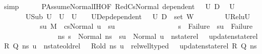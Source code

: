 \begin{isabellebody}
\ simp\isanewline
\ \ \ \ \isamarkupfalse%
\ PAssumeNormal{\isachardot}{\kern0pt}IH{\isacharbrackleft}{\kern0pt}OF\ RedCs{}Normal\ {\isacartoucheopen}dependent\ {\isasymLambda}{\isacharprime}{\kern0pt}\ {\isasymOmega}\ U{}\ D{}{\isacartoucheclose}{\isacharbrackright}{\kern0pt}\ \isamarkupfalse%
\ U{}\ \isanewline
\ \ \ \ \ \ \ U{}Sub{\isacharcolon}{\kern0pt}\ {\isachardoublequoteopen}U{}\ {\isasymsubseteq}\ U{}{\isachardoublequoteclose}\ \ {\isachardoublequoteopen}U{}\ {\isasymnoteq}\ {\isacharbraceleft}{\kern0pt}{\isacharbraceright}{\kern0pt}{\isachardoublequoteclose}\ \ U{}Dep{\isacharcolon}{\kern0pt}{\isachardoublequoteopen}dependent\ {\isasymLambda}{\isacharprime}{\kern0pt}\ {\isasymOmega}\ U{}\ {\isacharparenleft}{\kern0pt}D{}\ {\isasymunion}\ set\ W{\isacharparenright}{\kern0pt}{\isachardoublequoteclose}\ \isanewline
\ \ \ \ \ \ \ U{}Rel{\isacharcolon}{\kern0pt}{\isachardoublequoteopen}{\isacharparenleft}{\kern0pt}{\isasymforall}u{\isasymin}U{}{\isachardot}{\kern0pt}\isanewline
\ \ \ \ \ \ \ \ \ \ \ {\isasymexists}su{\isachardot}{\kern0pt}\ {\isacharparenleft}{\kern0pt}M{\isacharcomma}{\kern0pt}{\isasymLambda}{\isacharprime}{\kern0pt}{\isacharcomma}{\kern0pt}{\isasymGamma}{\isacharcomma}{\kern0pt}{\isasymOmega}\ {\isasymturnstile}\ {\isasymlangle}cs{}{\isacharcomma}{\kern0pt}Normal\ u{\isasymrangle}\ {\isacharbrackleft}{\kern0pt}{\isasymrightarrow}{\isacharbrackright}{\kern0pt}\ su{\isacharparenright}{\kern0pt}\ {\isasymand}\isanewline
\ \ \ \ \ \ \ \ \ \ \ \ \ \ \ \ {\isacharparenleft}{\kern0pt}s{\isacharprime}{\kern0pt}\ {\isacharequal}{\kern0pt}\ Failure\ {\isasymlongrightarrow}\ su\ {\isacharequal}{\kern0pt}\ Failure{\isacharparenright}{\kern0pt}\ {\isasymand}\isanewline
\ \ \ \ \ \ \ \ \ \ \ \ \ \ \ \ {\isacharparenleft}{\kern0pt}{\isasymforall}ns{\isacharprime}{\kern0pt}{\isachardot}{\kern0pt}\ s{\isacharprime}{\kern0pt}\ {\isacharequal}{\kern0pt}\ Normal\ ns{\isacharprime}{\kern0pt}\ {\isasymlongrightarrow}\ su\ {\isacharequal}{\kern0pt}\ Normal\ u\ {\isasymand}\ nstate{\isacharunderscore}{\kern0pt}rel\ {\isasymLambda}\ {\isasymLambda}{\isacharprime}{\kern0pt}\ {\isacharparenleft}{\kern0pt}update{\isacharunderscore}{\kern0pt}nstate{\isacharunderscore}{\kern0pt}rel\ R\ Q{\isacharparenright}{\kern0pt}\ ns{\isacharprime}{\kern0pt}\ u\ {\isasymand}\ nstate{\isacharunderscore}{\kern0pt}old{\isacharunderscore}{\kern0pt}rel\ {\isasymLambda}\ {\isasymLambda}{\isacharprime}{\kern0pt}\ R{\isacharunderscore}{\kern0pt}old\ ns{\isacharprime}{\kern0pt}\ u\ {\isasymand}\ rel{\isacharunderscore}{\kern0pt}well{\isacharunderscore}{\kern0pt}typed\ {\isasymLambda}\ {\isasymOmega}\ {\isacharparenleft}{\kern0pt}update{\isacharunderscore}{\kern0pt}nstate{\isacharunderscore}{\kern0pt}rel\ R\ Q{\isacharparenright}{\kern0pt}\ ns{\isacharprime}{\kern0pt}{\isacharparenright}{\kern0pt}{\isacharparenright}{\kern0pt}{\isachardoublequoteclose}\isanewline

\end{isabellebody}
